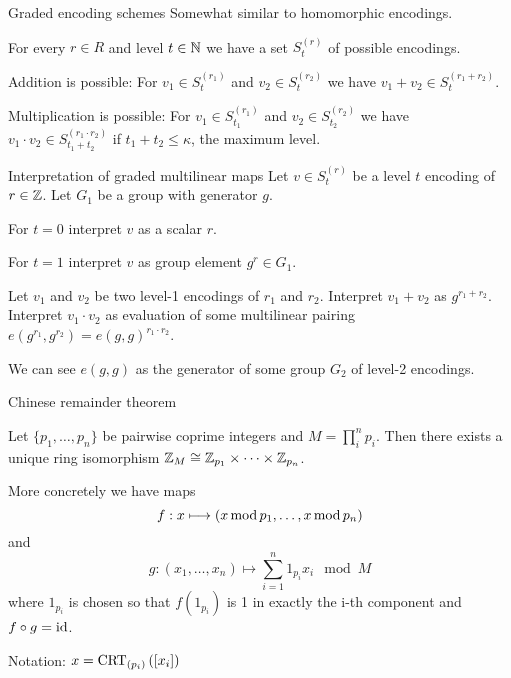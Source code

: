 \documentclass[english]{beamer}
\begin{document}
    \begin{frame}{Graded encoding schemes}
        Somewhat similar to homomorphic encodings.

        For every $r \in R$ and level $t \in \mathbb{N}$ we have a set $S^{(r)}_t$ of possible encodings.

        Addition is possible: For $v_1 \in S^{(r_1)}_t$ and $v_2 \in S^{(r_2)}_t$ we have $v_1 + v_2 \in S^{(r_1 + r_2)}_t$.

        Multiplication is possible: For $v_1 \in S^{(r_1)}_{t_1}$ and $v_2 \in S^{(r_2)}_{t_2}$ we have $v_1 \cdot v_2 \in S^{(r_1 \cdot r_2)}_{t_1 + t_2}$ if $t_1 + t_2 \leq \kappa$, the maximum level.
    \end{frame}
    \begin{frame}{Interpretation of graded multilinear maps}
        Let $v \in S^{(r)}_t$ be a level $t$ encoding of $r \in \mathbb{Z}$. Let $G_1$ be a group with generator $g$.

        For $t = 0$ interpret $v$ as a scalar $r$.

        For $t = 1$ interpret $v$ as group element $g^r \in G_1$.
        \pause

        Let $v_1$ and $v_2$ be two level-1 encodings of $r_1$ and $r_2$. Interpret $v_1 + v_2$ as $g^{r_1 + r_2}$. Interpret $v_1 \cdot v_2$ as evaluation of some multilinear pairing $e(g^{r_1}, g^{r_2}) = e(g, g)^{r_1 \cdot r_2}$.
        \pause

        \Rightarrow We can see $e(g, g)$ as the generator of some group $G_2$ of level-2 encodings.
    \end{frame}
    \begin{frame}{Chinese remainder theorem}
        \begin{theorem}
            Let $\{p_1, \dots, p_n\}$ be pairwise coprime integers and $M = \prod_i^n p_i$. Then there exists a unique ring isomorphism $\mathbb{Z}_M \cong \mathbb{Z}_{p_1} \times \dots \times \mathbb{Z}_{p_n}$.
        \end{theorem}

        More concretely we have maps
        \begin{equation*}
            f : x \longmapsto (x \operatorname{mod} p_1, \dots, x \operatorname{mod} p_n)
        \end{equation*}
        and
        \begin{equation*}
            g : (x_1, \dots, x_n) \longmapsto \sum_{i=1}^n 1_{p_i}x_i \mod M
        \end{equation*}
        where $1_{p_i}$ is chosen so that $f\left(1_{p_i}\right)$ is 1 in exactly the i-th component and $f \circ g = \operatorname{id}$.

        Notation: $x = \operatorname{CRT}_{(p_{i})}\left(\left[x_i\right]\right)$
    \end{frame}
\end{document}
